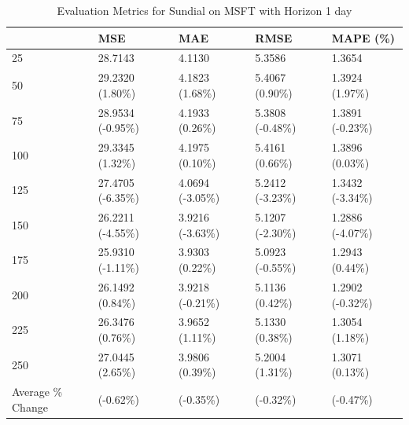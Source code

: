 \begin{table}
\caption{Evaluation Metrics for Sundial on MSFT with Horizon 1 day}
\label{tab:sundial_MSFT_h1_metrics}
\begin{tabular}{lllll}
\toprule
 & MSE & MAE & RMSE & MAPE (\%) \\
\midrule
25 & 28.7143 & 4.1130 & 5.3586 & 1.3654 \\
50 & 29.2320 (1.80\%) & 4.1823 (1.68\%) & 5.4067 (0.90\%) & 1.3924 (1.97\%) \\
75 & 28.9534 (-0.95\%) & 4.1933 (0.26\%) & 5.3808 (-0.48\%) & 1.3891 (-0.23\%) \\
100 & 29.3345 (1.32\%) & 4.1975 (0.10\%) & 5.4161 (0.66\%) & 1.3896 (0.03\%) \\
125 & 27.4705 (-6.35\%) & 4.0694 (-3.05\%) & 5.2412 (-3.23\%) & 1.3432 (-3.34\%) \\
150 & 26.2211 (-4.55\%) & 3.9216 (-3.63\%) & 5.1207 (-2.30\%) & 1.2886 (-4.07\%) \\
175 & 25.9310 (-1.11\%) & 3.9303 (0.22\%) & 5.0923 (-0.55\%) & 1.2943 (0.44\%) \\
200 & 26.1492 (0.84\%) & 3.9218 (-0.21\%) & 5.1136 (0.42\%) & 1.2902 (-0.32\%) \\
225 & 26.3476 (0.76\%) & 3.9652 (1.11\%) & 5.1330 (0.38\%) & 1.3054 (1.18\%) \\
250 & 27.0445 (2.65\%) & 3.9806 (0.39\%) & 5.2004 (1.31\%) & 1.3071 (0.13\%) \\
Average \% Change & (-0.62\%) & (-0.35\%) & (-0.32\%) & (-0.47\%) \\
\bottomrule
\end{tabular}
\end{table}

